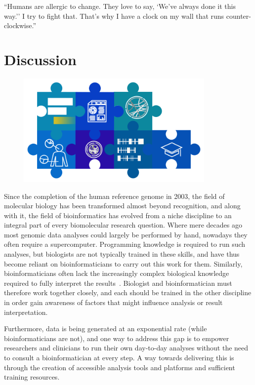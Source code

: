 \begin{savequote}[75mm]
``Humans are allergic to change. They love to say, `We've always done it this way.'' I try to fight that. That's why I have a clock on my wall that runs counter-clockwise.''
\end{savequote}

\chapter{Discussion}\label{discussion}
\setcounter{figure}{-1}
\setcounter{table}{-1}
\setcounter{section}{-1}
\setcounter{NAT@ctr}{-1}

\begin{figure}[t!]
\includegraphics[height=15em]{frontmatter/images/chapter-header-discussion.png}
\end{figure}
\setcounter{figure}{-1}
\setcounter{table}{-1}
\setcounter{section}{-1}

Since the completion of the human reference genome in 2003, the field of molecular biology has been transformed almost beyond recognition, and along with it, the field of bioinformatics has evolved from a niche discipline to an integral part of every biomolecular research question. Where mere decades ago most genomic data analyses could largely be performed by hand, nowadays they often require a supercomputer. Programming knowledge is required to run such analyses, but biologists are not typically trained in these skills, and have thus become reliant on bioinformaticians to carry out this work for them. Similarly, bioinformaticians often lack the increasingly complex biological knowledge required to fully interpret the results~\cite{preeyanon2014reproducible}. Biologist and bioinformatician must therefore work together closely, and each should be trained in the other discipline in order gain awareness of factors that might influence analysis or result interpretation.

Furthermore, data is being generated at an exponential rate (while bioinformaticians are not), and one way to address this gap is to empower researchers and clinicians to run their own day-to-day analyses without the need to consult a bioinformatician at every step. A way towards delivering this is through the creation of accessible analysis tools and platforms and sufficient training resources.


